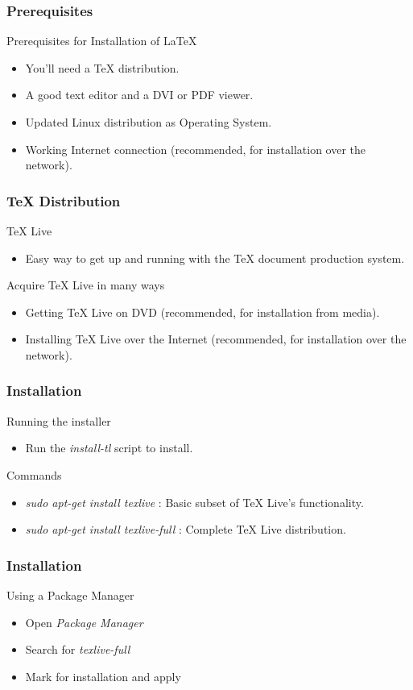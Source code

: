 \documentclass[14pt,compress]{beamer}
\begin{document}
\begin{frame}
  \frametitle{Prerequisites}
  Prerequisites for Installation of LaTeX
  \begin{itemize}
  \item You'll need a TeX distribution.
  \item A good text editor and a DVI or PDF viewer.
  \item Updated Linux distribution as Operating System.
  \item Working Internet connection (recommended, for installation over the network).
  \end{itemize}
\end{frame}

\begin{frame}[fragile]
  \frametitle{TeX Distribution}
  TeX Live
  \begin{itemize}
  \item Easy way to get up and running with the TeX document production system.
  \end{itemize}
  Acquire TeX Live in many ways
  \begin{itemize}
  \item Getting TeX Live on DVD (recommended, for installation from media).
  \item Installing TeX Live over the Internet (recommended, for installation over the network).
  \end{itemize}
\end{frame}

\begin{frame}[fragile]
  \frametitle{Installation}
  Running the installer
  \begin{itemize}
  \item Run the \emph{install-tl} script to install.
  \end{itemize}
  Commands
  \begin{itemize}
  \item \emph{sudo apt-get install texlive} : Basic subset of TeX Live's functionality.
  \item \emph{sudo apt-get install texlive-full} : Complete TeX Live distribution.
  \end{itemize}
\end{frame}

\begin{frame}[fragile]
  \frametitle{Installation}
  Using a Package Manager
  \begin{itemize}
  \item Open \emph{Package Manager}
  \item Search for \emph{texlive-full}
  \item Mark for installation and apply
  \end{itemize}
\end{frame}
\end{document}
